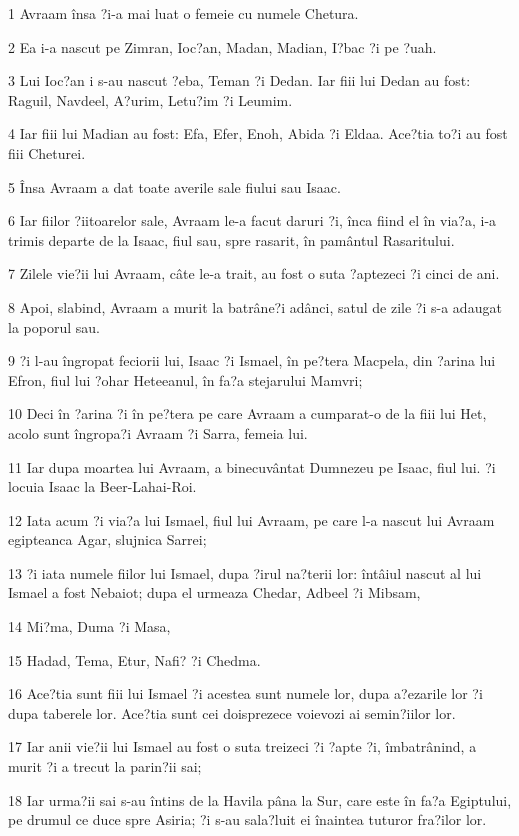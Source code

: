 \par 1 Avraam însa ?i-a mai luat o femeie cu numele Chetura.
\par 2 Ea i-a nascut pe Zimran, Ioc?an, Madan, Madian, I?bac ?i pe ?uah.
\par 3 Lui Ioc?an i s-au nascut ?eba, Teman ?i Dedan. Iar fiii lui Dedan au fost: Raguil, Navdeel, A?urim, Letu?im ?i Leumim.
\par 4 Iar fiii lui Madian au fost: Efa, Efer, Enoh, Abida ?i Eldaa. Ace?tia to?i au fost fiii Cheturei.
\par 5 Însa Avraam a dat toate averile sale fiului sau Isaac.
\par 6 Iar fiilor ?iitoarelor sale, Avraam le-a facut daruri ?i, înca fiind el în via?a, i-a trimis departe de la Isaac, fiul sau, spre rasarit, în pamântul Rasaritului.
\par 7 Zilele vie?ii lui Avraam, câte le-a trait, au fost o suta ?aptezeci ?i cinci de ani.
\par 8 Apoi, slabind, Avraam a murit la batrâne?i adânci, satul de zile ?i s-a adaugat la poporul sau.
\par 9 ?i l-au îngropat feciorii lui, Isaac ?i Ismael, în pe?tera Macpela, din ?arina lui Efron, fiul lui ?ohar Heteeanul, în fa?a stejarului Mamvri;
\par 10 Deci în ?arina ?i în pe?tera pe care Avraam a cumparat-o de la fiii lui Het, acolo sunt îngropa?i Avraam ?i Sarra, femeia lui.
\par 11 Iar dupa moartea lui Avraam, a binecuvântat Dumnezeu pe Isaac, fiul lui. ?i locuia Isaac la Beer-Lahai-Roi.
\par 12 Iata acum ?i via?a lui Ismael, fiul lui Avraam, pe care l-a nascut lui Avraam egipteanca Agar, slujnica Sarrei;
\par 13 ?i iata numele fiilor lui Ismael, dupa ?irul na?terii lor: întâiul nascut al lui Ismael a fost Nebaiot; dupa el urmeaza Chedar, Adbeel ?i Mibsam,
\par 14 Mi?ma, Duma ?i Masa,
\par 15 Hadad, Tema, Etur, Nafi? ?i Chedma.
\par 16 Ace?tia sunt fiii lui Ismael ?i acestea sunt numele lor, dupa a?ezarile lor ?i dupa taberele lor. Ace?tia sunt cei doisprezece voievozi ai semin?iilor lor.
\par 17 Iar anii vie?ii lui Ismael au fost o suta treizeci ?i ?apte ?i, îmbatrânind, a murit ?i a trecut la parin?ii sai;
\par 18 Iar urma?ii sai s-au întins de la Havila pâna la Sur, care este în fa?a Egiptului, pe drumul ce duce spre Asiria; ?i s-au sala?luit ei înaintea tuturor fra?ilor lor.
